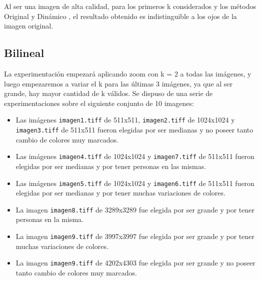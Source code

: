 \documentclass[a4paper]{article}
\newcounter{col}
\begin{document}
Al ser una imagen de alta calidad, para los primeros k considerados y los métodos Original y Dinámico , el resultado obtenido es indistinguible a los ojos de la imagen original.




\subsection{Bilineal}
La experimentaci\'on empezar\'a aplicando zoom con k = 2 a todas las im\'agenes, y luego empezaremos a variar el k para las \'ultimas 3 im\'agenes, ya que al ser grande, hay mayor cantidad de k v\'alidos.
Se dispuso de una serie de experimentaciones sobre el siguiente conjunto de 10 imagenes:\\
\begin{itemize}
	\item Las im\'agenes \texttt{imagen1.tiff} de 511x511, \texttt{imagen2.tiff} de 1024x1024 y \texttt{imagen3.tiff} de 511x511 fueron elegidas por ser medianas y no poseer tanto cambio de colores muy marcados.
	\item Las im\'agenes \texttt{imagen4.tiff} de 1024x1024 y \texttt{imagen7.tiff} de 511x511 fueron elegidas por ser medianas y por tener personas en las mismas.
	\item Las im\'agenes \texttt{imagen5.tiff} de 1024x1024 y \texttt{imagen6.tiff} de 511x511 fueron elegidas por ser medianas y por tener muchas variaciones de colores.
	\item La imagen \texttt{imagen8.tiff} de 3289x3289 fue elegida por ser grande y por tener personas en la misma.
	\item La imagen \texttt{imagen9.tiff} de 3997x3997 fue elegida por ser grande y por tener muchas variaciones de colores.
	\item La imagen \texttt{imagen9.tiff} de 4202x4303 fue elegida por ser grande y no poseer tanto cambio de colores muy marcados.
\end{itemize}
\end{document}
